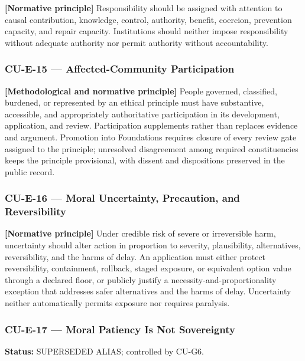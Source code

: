 \documentclass[
  11pt,
]{article}
\begin{document}
\textbf{{[}Normative principle{]}} Responsibility should be assigned
with attention to causal contribution, knowledge, control, authority,
benefit, coercion, prevention capacity, and repair capacity.
Institutions should neither impose responsibility without adequate
authority nor permit authority without accountability.

\subsubsection{CU-E-15 --- Affected-Community
Participation}\label{cu-e-15-affected-community-participation}

\textbf{{[}Methodological and normative principle{]}} People governed,
classified, burdened, or represented by an ethical principle must have
substantive, accessible, and appropriately authoritative participation
in its development, application, and review. Participation supplements
rather than replaces evidence and argument. Promotion into Foundations
requires closure of every review gate assigned to the principle;
unresolved disagreement among required constituencies keeps the
principle provisional, with dissent and dispositions preserved in the
public record.

\subsubsection{CU-E-16 --- Moral Uncertainty, Precaution, and
Reversibility}\label{cu-e-16-moral-uncertainty-precaution-and-reversibility}

\textbf{{[}Normative principle{]}} Under credible risk of severe or
irreversible harm, uncertainty should alter action in proportion to
severity, plausibility, alternatives, reversibility, and the harms of
delay. An application must either protect reversibility, containment,
rollback, staged exposure, or equivalent option value through a declared
floor, or publicly justify a necessity-and-proportionality exception
that addresses safer alternatives and the harms of delay. Uncertainty
neither automatically permits exposure nor requires paralysis.

\subsubsection{CU-E-17 --- Moral Patiency Is Not
Sovereignty}\label{cu-e-17-moral-patiency-is-not-sovereignty}

\textbf{Status:} SUPERSEDED ALIAS; controlled by CU-G6.
\end{document}
